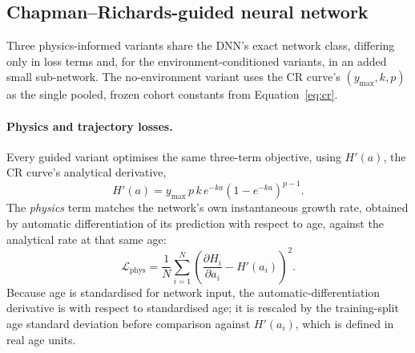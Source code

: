 \documentclass[11pt,a4paper]{report}
\begin{document}
\subsection{Chapman--Richards-guided neural network}

Three physics-informed variants share the DNN's exact network class, differing only in loss terms
and, for the environment-conditioned variants, in an added small sub-network. The no-environment
variant uses the CR curve's $(y_{\max},k,p)$ as the single pooled, frozen cohort constants from
Equation~\ref{eq:cr}.

\paragraph*{Physics and trajectory losses.}
Every guided variant optimises the same three-term objective, using $H'(a)$, the CR curve's
analytical derivative,
\begin{equation}
H'(a) = y_{\max}\,p\,k\,e^{-ka}\left(1-e^{-ka}\right)^{p-1}.
\label{eq:cr-derivative}
\end{equation}
The \emph{physics} term matches the network's own instantaneous growth rate, obtained by automatic
differentiation of its prediction with respect to age, against the analytical rate at that same
age:
\begin{equation}
\mathcal{L}_{\text{phys}} = \frac{1}{N}\sum_{i=1}^{N}\left(\frac{\partial \hat H_i}{\partial a_i} -
H'(a_i)\right)^2.
\label{eq:physics-loss}
\end{equation}
Because age is standardised for network input, the automatic-differentiation
derivative is with respect to standardised age; it is rescaled by the training-split age standard
deviation before comparison against $H'(a_i)$, which is defined in real age units.
\end{document}
